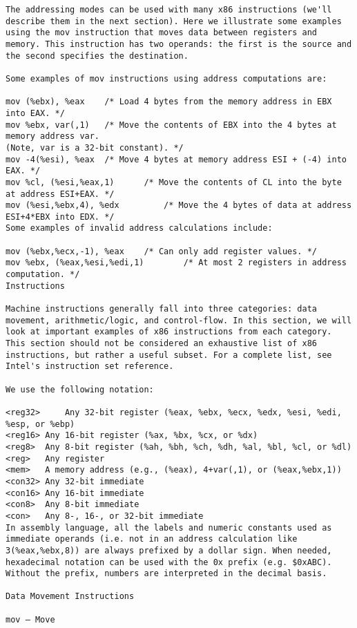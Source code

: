 \documentclass[10pt]{article}
\begin{document}
{\begin{multicols*}{5}
\begin{lstlisting}[breaklines=true,columns=fullflexible]
The addressing modes can be used with many x86 instructions (we'll describe them in the next section). Here we illustrate some examples using the mov instruction that moves data between registers and memory. This instruction has two operands: the first is the source and the second specifies the destination.

Some examples of mov instructions using address computations are:

mov (%ebx), %eax	/* Load 4 bytes from the memory address in EBX into EAX. */
mov %ebx, var(,1)	/* Move the contents of EBX into the 4 bytes at memory address var.
(Note, var is a 32-bit constant). */
mov -4(%esi), %eax	/* Move 4 bytes at memory address ESI + (-4) into EAX. */
mov %cl, (%esi,%eax,1)   	/* Move the contents of CL into the byte at address ESI+EAX. */
mov (%esi,%ebx,4), %edx     	/* Move the 4 bytes of data at address ESI+4*EBX into EDX. */
Some examples of invalid address calculations include:

mov (%ebx,%ecx,-1), %eax	/* Can only add register values. */
mov %ebx, (%eax,%esi,%edi,1)     	/* At most 2 registers in address computation. */
Instructions

Machine instructions generally fall into three categories: data movement, arithmetic/logic, and control-flow. In this section, we will look at important examples of x86 instructions from each category. This section should not be considered an exhaustive list of x86 instructions, but rather a useful subset. For a complete list, see Intel's instruction set reference.

We use the following notation:

<reg32>    	Any 32-bit register (%eax, %ebx, %ecx, %edx, %esi, %edi, %esp, or %ebp)
<reg16>	Any 16-bit register (%ax, %bx, %cx, or %dx)
<reg8>	Any 8-bit register (%ah, %bh, %ch, %dh, %al, %bl, %cl, or %dl)
<reg>	Any register
<mem>	A memory address (e.g., (%eax), 4+var(,1), or (%eax,%ebx,1))
<con32>	Any 32-bit immediate
<con16>	Any 16-bit immediate
<con8>	Any 8-bit immediate
<con>	Any 8-, 16-, or 32-bit immediate
In assembly language, all the labels and numeric constants used as immediate operands (i.e. not in an address calculation like 3(%eax,%ebx,8)) are always prefixed by a dollar sign. When needed, hexadecimal notation can be used with the 0x prefix (e.g. $0xABC). Without the prefix, numbers are interpreted in the decimal basis.

Data Movement Instructions

mov — Move


\end{lstlisting}
\end{multicols*}}
\end{document}
